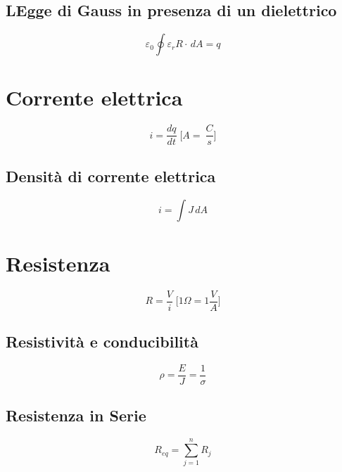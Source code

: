         \subsection*{LEgge di Gauss in presenza di un dielettrico}
            \begin{equation*}
                \varepsilon_0 \oint \varepsilon_rR\cdot\,dA = q
            \end{equation*}

    \section*{Corrente elettrica}
        \begin{equation*}
            i = \frac{dq}{dt} \; \Bigg[A = \ \frac{C}{s}\Bigg]
        \end{equation*}

        \subsection*{Densità di corrente elettrica}
            \begin{equation*}
                i = \int J \, dA
            \end{equation*}
        
    \section*{Resistenza}
        \begin{equation*}
            R = \frac{V}{i} \; \Bigg[1 \Omega = 1 \frac{V}{A}\Bigg]        
        \end{equation*}
        
        \subsection*{Resistività e conducibilità}
            \begin{equation*}
                \rho = \frac{E}{J} = \frac{1}{\sigma}
            \end{equation*}

        \subsection*{Resistenza in Serie}
            \begin{equation*}
                R_{eq} = \sum_{j=1}^{n} R_j
            \end{equation*}


